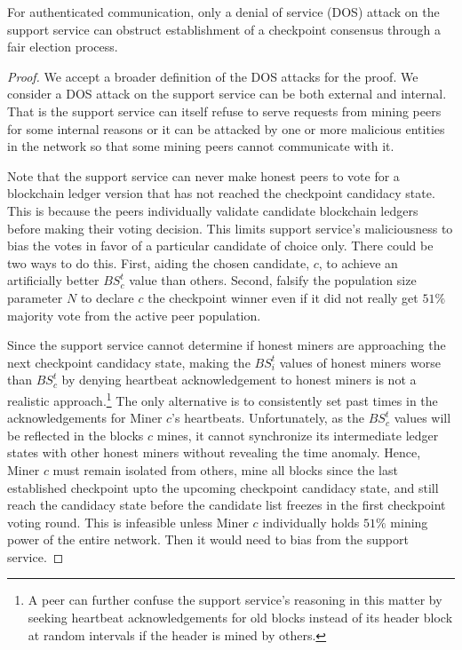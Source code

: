 \begin{lemma}
\label{l-support-attack}
For authenticated communication, only a denial of service (DOS) attack  on the support service can obstruct establishment of a checkpoint consensus through a fair election process.    
\end{lemma}
\begin{proof}
We accept a broader definition of the DOS attacks for the proof. We consider a DOS attack on the support service can be both external and internal. That is the support service can itself refuse to serve requests from mining peers for some internal reasons or it can be attacked by one or more malicious entities in the network so that some mining peers cannot communicate with it. 

Note that the support service can never make honest peers to vote for a blockchain ledger version that has not reached the checkpoint candidacy state. This is because the peers individually validate candidate blockchain ledgers before making their voting decision. This limits support service's maliciousness to bias the votes in favor of a particular candidate of choice only. There could be two ways to do this. First, aiding the chosen candidate, $c$, to achieve an artificially better $BS_c^t$ value than others. Second, falsify the population size parameter $N$ to declare $c$ the checkpoint winner even if it did not really get $51\%$ majority vote from the active peer population.  

Since the support service cannot determine if honest miners are approaching the next checkpoint candidacy state, making the $BS_i^t$ values of honest miners worse than $BS_c^t$ by denying heartbeat acknowledgement to honest miners is not a realistic approach.\footnote{A peer can further confuse the support service's reasoning in this matter by seeking heartbeat acknowledgements for old blocks instead of its header block at random intervals if the header is mined by others.} The only alternative is to consistently set past times in the acknowledgements for Miner $c$'s heartbeats. Unfortunately, as the $BS_c^t$ values will be reflected in the blocks $c$ mines, it cannot synchronize its intermediate ledger states with other honest miners without revealing the time anomaly. Hence, Miner $c$ must remain isolated from others, mine all blocks since the last established checkpoint upto the upcoming checkpoint candidacy state, and still reach the candidacy state before the candidate list freezes in the first checkpoint voting round. This is infeasible unless Miner $c$ individually holds $51\%$ mining power of the entire network. Then it would need to bias from the support service.      


\end{proof}
